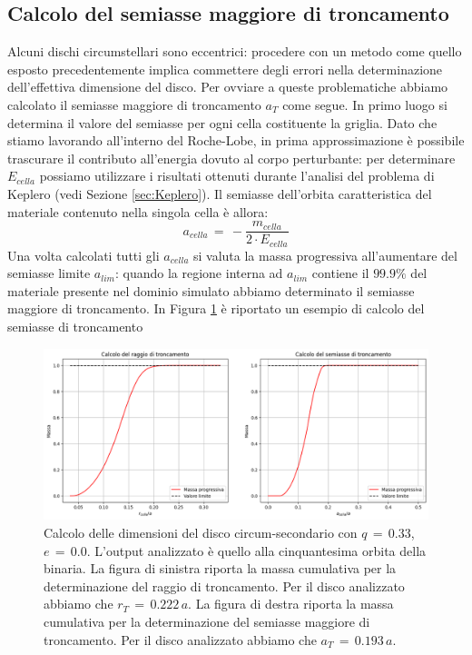 \subsection{Calcolo del semiasse maggiore di troncamento}

Alcuni dischi circumstellari sono eccentrici: procedere con un metodo come quello esposto precedentemente implica commettere degli errori nella determinazione dell'effettiva dimensione del disco. Per ovviare a queste problematiche abbiamo calcolato il semiasse maggiore di troncamento $a_T$ come segue. In primo luogo si determina il valore del semiasse per ogni cella costituente la griglia. Dato che stiamo lavorando all'interno del Roche-Lobe, in prima approssimazione è possibile trascurare il contributo all'energia dovuto al corpo perturbante: per determinare $E_{cella}$ possiamo utilizzare i risultati ottenuti durante l'analisi del problema di Keplero (vedi Sezione \ref{sec:Keplero}). Il semiasse dell'orbita caratteristica del materiale contenuto nella singola cella è allora:
\begin{equation}
a_{cella}\,=\,-\frac{m_{cella}}{2\cdot E_{cella}}
\label{eq:sax_cella}
\end{equation}
Una volta calcolati tutti gli $a_{cella}$ si valuta la massa progressiva all'aumentare del semiasse limite $a_{lim}$: quando la regione interna ad $a_{lim}$ contiene il $99.9\%$ del materiale presente nel dominio simulato abbiamo determinato il semiasse maggiore di troncamento.
In Figura \ref{fig:cal_dim} è riportato un esempio di calcolo del semiasse di troncamento

\begin{figure}[h]
    \centering
    \includegraphics[width=\textwidth]{Immagini/Simulazioni/cal_dimdisco.png}
    \caption{Calcolo delle dimensioni del disco circum-secondario con $q\,=\,0.33$, $e\,=\,0.0$. L'output analizzato è quello alla cinquantesima orbita della binaria. La figura di sinistra riporta la massa cumulativa per la determinazione del raggio di troncamento. Per il disco analizzato abbiamo che $r_T\,=\,0.222\,a$. La figura di destra riporta la massa cumulativa per la determinazione del semiasse maggiore di troncamento. Per il disco analizzato abbiamo che $a_T\,=\,0.193\,a$.}
    \label{fig:cal_dim}
\end{figure}



